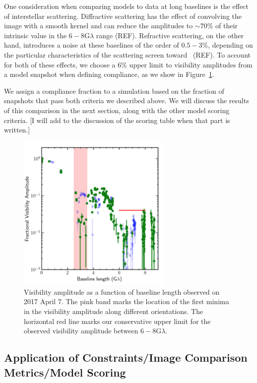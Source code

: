 \documentclass[twocolumn,tighten,dvipsnames,linenumbers]{aastex63}
\begin{document}
One consideration when comparing models to data at long baselines
is the effect of interstellar scattering. Diffractive scattering has
the effect of convolving the image with a smooth kernel and can
reduce the amplitudes to $\sim 70\%$ of their intrinsic value in the
$6-8$\;G$\lambda$ range (REF).  Refractive scattering, on the other
hand, introduces a noise at these baselines of the order of $0.5-3\%$,
depending on the particular characteristics of the scattering screen
toward \sgra\ (REF). To account for both of these effects, we choose a
$6\%$ upper limit to visibility amplitudes from a model snapshot
when defining compliance, as we show in Figure~\ref{fig:data_comp}.

We assign a compliance fraction to a simulation based on the fraction
of snapshots that pass both criteria we described above. We will
discuss the results of this comparison in the next section, along with
the other model scoring criteria. [I will add to the discussion of the
scoring table when that part is written.]

\begin{figure}
 \centerline{
    \includegraphics[width=7.5cm] {data_3599}}
\caption{\footnotesize Visibility amplitude as a function of baseline length observed on 2017 April 7. The pink band marks the location of the first minima in the visibility amplitude along different orientations. The horizontal red line marks our conservative upper limit for the observed visibility amplitude between $6-8$G$\lambda$.}
\label{fig:data_comp}
\end{figure}

\subsection{Application of Constraints/Image Comparison Metrics/Model Scoring}
\label{sec:apply}
\end{document}
